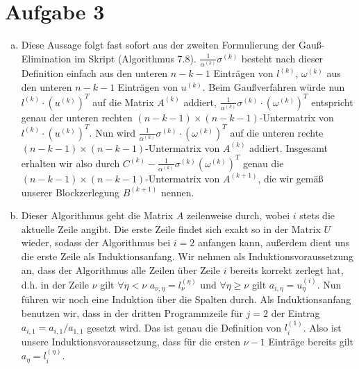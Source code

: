 \documentclass{article}
\theoremstyle{definition}
\begin{document}
\section*{Aufgabe 3}
\begin{enumerate}[(a)]
    \item Diese Aussage folgt fast sofort aus der zweiten Formulierung der Gauß-Elimination im Skript (Algorithmus 7.8). $\frac{1}{\alpha^{(k)}}\sigma^{(k)}$ besteht nach dieser Definition einfach aus den unteren $n-k-1$ Einträgen von $l^{(k)}$, $\omega^{(k)}$ aus den unteren $n-k-1$ Einträgen von $u^{(k)}$. Beim Gaußverfahren würde nun $l^{(k)}\cdot \left(u^{(k)}\right)^T$ auf die Matrix $A^{(k)}$ addiert, $\frac{1}{\alpha^{(k)}}\sigma^{(k)}\cdot \left(\omega^{(k)}\right)^T$ entspricht genau der unteren rechten $(n-k-1)\times (n-k-1)$-Untermatrix von $l^{(k)}\cdot \left(u^{(k)}\right)^T$. Nun wird $\frac{1}{\alpha^{(k)}}\sigma^{(k)}\cdot \left(\omega^{(k)}\right)^T$ auf die unteren rechte $(n-k-1)\times (n-k-1)$-Untermatrix von $A^{(k)}$ addiert. Insgesamt erhalten wir also durch $C^{(k)} - \frac{1}{\alpha^{(k)}}\sigma^{(k)}(\omega^{(k)})^T$ genau die $(n-k-1)\times (n-k-1)$-Untermatrix von $A^{(k+1)}$, die wir gemäß unserer Blockzerlegung $B^{(k+1)}$ nennen.
    \item Dieser Algorithmus geht die Matrix $A$ zeilenweise durch, wobei $i$ stets die aktuelle Zeile angibt. Die erste Zeile findet sich exakt so in der Matrix $U$ wieder, sodass der Algorithmus bei $i = 2$ anfangen kann, außerdem dient uns die erste Zeile als Induktionsanfang. Wir nehmen als Induktionsvoraussetzung an, dass der Algorithmus alle Zeilen über Zeile $i$ bereits korrekt zerlegt hat, d.h. in der Zeile $\nu$ gilt $\forall \eta < \nu$ $a_{\nu,\eta} = l^{(\eta)}_\nu$ und $\forall \eta \ge \nu$ gilt $a_{i,\eta} = u^{(i)}_\eta$.
    Nun führen wir noch eine Induktion über die Spalten durch. Als Induktionsanfang benutzen wir, dass in der dritten Programmzeile für $j=2$ der Eintrag $a_{i,1} = a_{i,1}/a_{1,1}$ gesetzt wird. Das ist genau die Definition von $l^{(1)}_i$. Also ist unsere Induktionsvoraussetzung, dass für die ersten $\nu-1$ Einträge bereits gilt $a_\eta = l^{(\eta)}_i$.

\end{enumerate}
\end{document}
